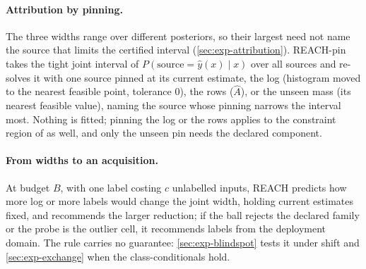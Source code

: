 \paragraph{Attribution by pinning.} The three widths range over different posteriors, so their largest
need not name the source that limits the certified interval (\cref{sec:exp-attribution}). REACH-pin takes
the tight joint interval of $P(\text{source}=\hat y(x)\mid x)$ over all sources and re-solves it with one
source pinned at its current estimate, the log (histogram moved to the nearest feasible point, tolerance
$0$), the rows ($\hat A$), or the unseen mass (its nearest feasible value), naming the source whose pinning
narrows the interval most. Nothing is fitted; pinning the log or the rows applies to the constraint region
of \citet{li2026matrix} as well, and only the unseen pin needs the declared component.

\paragraph{From widths to an acquisition.} At budget $B$, with one label costing $c$ unlabelled inputs,
REACH predicts how more log or more labels would change the joint width, holding current estimates
fixed, and recommends the larger reduction; if the ball rejects the declared family or the probe is the
outlier cell, it recommends labels from the deployment domain. The rule carries no guarantee:
\cref{sec:exp-blindspot} tests it under shift and \cref{sec:exp-exchange} when the class-conditionals hold.
